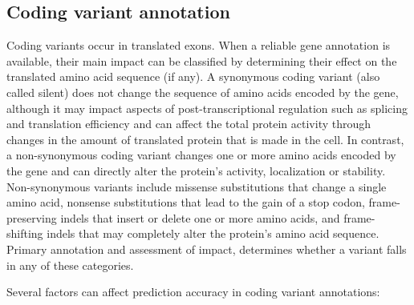 \subsection{Coding variant annotation}

Coding variants occur in translated exons. 
When a reliable gene annotation is available, their main impact can be classified by determining their effect on the translated amino acid sequence (if any). 
A synonymous coding variant (also called silent) does not change the sequence of amino acids encoded by the gene, although it may impact aspects of post-transcriptional regulation such as splicing and translation efficiency and can affect the total protein activity through changes in the amount of translated protein that is made in the cell. 
In contrast, a non-synonymous coding variant changes one or more amino acids encoded by the gene and can directly alter the protein's activity, localization or stability. 
Non-synonymous variants include missense substitutions that change a single amino acid, nonsense substitutions that lead to the gain of a stop codon, frame-preserving indels that insert or delete one or more amino acids, and frame-shifting indels that may completely alter the protein's amino acid sequence. 
Primary annotation and assessment of impact, determines whether a variant falls in any of these categories.

Several factors can affect prediction accuracy in coding variant annotations:

